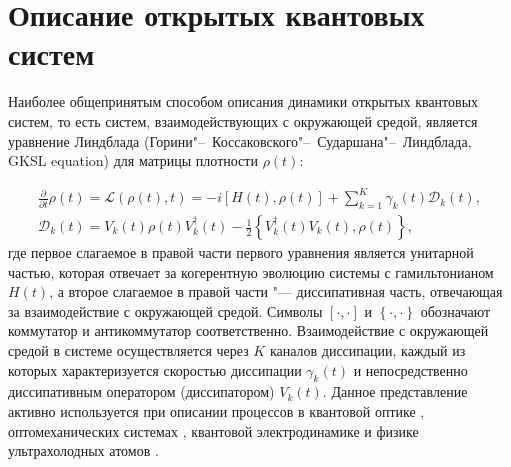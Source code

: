 \section{Описание открытых квантовых систем}\label{sec:ch1/sec1}

Наиболее общепринятым способом описания динамики открытых квантовых систем, то есть систем, взаимодействующих с окружающей средой, является уравнение Линдблада (Горини"--~Коссаковского"--~Сударшана"--~Линдблада, GKSL equation) \cite{Gorini1976, Lindblad1976, Chruciski2017} для матрицы плотности \(\rho (t)\):

\begin{equation}
\label{eq:GKSL_base}
\begin{gathered}
\frac{\partial}{\partial t} \rho (t) = \mathcal{L}(\rho(t), t) = -i \left[ H(t), \rho(t) \right] + \sum_{k=1}^{K} \gamma_{k}(t) \mathcal{D}_k(t), \\
\mathcal{D}_k(t) =  V_k(t) \rho(t) V_k^\dagger(t) - \frac{1}{2} \left\lbrace V_k^\dagger(t) V_k(t), \rho(t) \right\rbrace ,
\end{gathered}
\end{equation}
где первое слагаемое в правой части первого уравнения является унитарной частью, которая отвечает за когерентную эволюцию системы с гамильтонианом \(H(t)\), а второе слагаемое в правой части "--- диссипативная часть, отвечающая за взаимодействие с окружающей средой. Символы \(\left[ \cdot, \cdot \right]\) и  \(\left\lbrace \cdot, \cdot \right\rbrace\) обозначают коммутатор и антикоммутатор соответственно. Взаимодействие с окружающей средой в системе осуществляется через \(K\) каналов диссипации, каждый из которых характеризуется скоростью диссипации \(\gamma_{k}(t)\) и непосредственно диссипативным оператором (диссипатором) \(V_k(t)\).  
Данное представление активно используется при описании процессов в квантовой оптике \cite{Carmichael1993}, оптомеханических системах \cite{Aspelmeyer2014}, квантовой электродинамике \cite{Jin2013, Fitzpatrick2017} и физике ультрахолодных атомов \cite{Diehl2008, Marcuzzi2014}.

